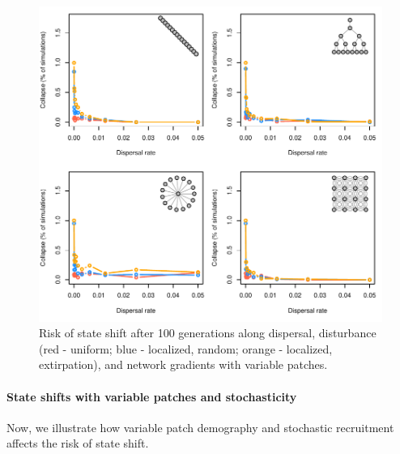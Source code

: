 \documentclass[
]{article}
\begin{document}
\begin{figure}[H]

{\centering \includegraphics{Managing_for_ecological_surprises_in_metapopulations_files/figure-latex/collapsed with variable patches-1} 

}

\caption{Risk of state shift after 100 generations along dispersal, disturbance (red - uniform; blue - localized, random; orange - localized, extirpation), and network gradients with variable patches.}\label{fig:collapsed with variable patches}
\end{figure}
\newpage

\hypertarget{state-shifts-with-variable-patches-and-stochasticity}{%
\paragraph{State shifts with variable patches and
stochasticity}\label{state-shifts-with-variable-patches-and-stochasticity}}

Now, we illustrate how variable patch demography and stochastic
recruitment affects the risk of state shift.
\end{document}
